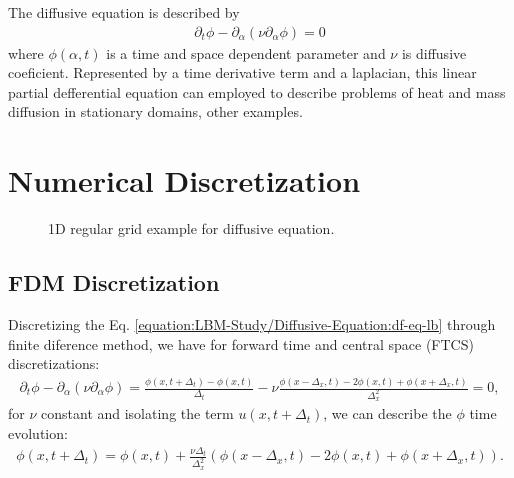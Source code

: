 \documentclass[letterpaper,10pt,english,openany,oneside]{jupyterBook}
\begin{document}
\sphinxAtStartPar
The diffusive equation is described by
\begin{equation}\label{equation:LBM-Study/Diffusive-Equation:df-eq-lb}
\begin{split}
\partial_t \phi - \partial_{\alpha}\left( \nu \partial_{\alpha}\phi \right) = 0
\end{split}
\end{equation}
\sphinxAtStartPar
where \(\phi(\alpha,t)\) is a time and space dependent parameter and \(\nu\) is diffusive coeficient. Represented by a time derivative term and a laplacian, this linear partial defferential equation can employed to describe problems of heat and mass diffusion in stationary domains, other examples.


\section{Numerical Discretization}
\label{\detokenize{LBM-Study/Diffusive-Equation:numerical-discretization}}
\begin{figure}[htbp]
\centering
\capstart

\noindent{}
\caption{1D regular grid example for diffusive equation.}\label{\detokenize{LBM-Study/Diffusive-Equation:mesh-1-diffusive}}\end{figure}


\subsection{FDM Discretization}
\label{\detokenize{LBM-Study/Diffusive-Equation:fdm-discretization}}
\sphinxAtStartPar
Discretizing the Eq. \eqref{equation:LBM-Study/Diffusive-Equation:df-eq-lb} through finite diference method, we have for forward time and central space (FTCS) discretizations:
\begin{equation*}
\begin{split}
\partial_t \phi - \partial_{\alpha}\left( \nu \partial_{\alpha}\phi \right) = \frac{\phi(x,t + \Delta_{t}) - \phi(x,t) }{\Delta_{t}} - \nu\frac{ \phi(x - \Delta_{x},t) -2\phi(x,t) + \phi(x + \Delta_{x},t) }{\Delta_{x}^{2}} =0,
\end{split}
\end{equation*}
\sphinxAtStartPar
for \(\nu\) constant and isolating the term \(u(x,t + \Delta_{t})\), we can describe the \(\phi\) time evolution:
\begin{equation*}
\begin{split}
\phi(x,t + \Delta_{t})   = \phi(x,t) + \frac{\nu\Delta_{t}}{\Delta_{x}^{2}} \left( \phi(x - \Delta_{x},t) -2\phi(x,t) + \phi(x + \Delta_{x},t) \right) .
\end{split}
\end{equation*}
\end{document}
